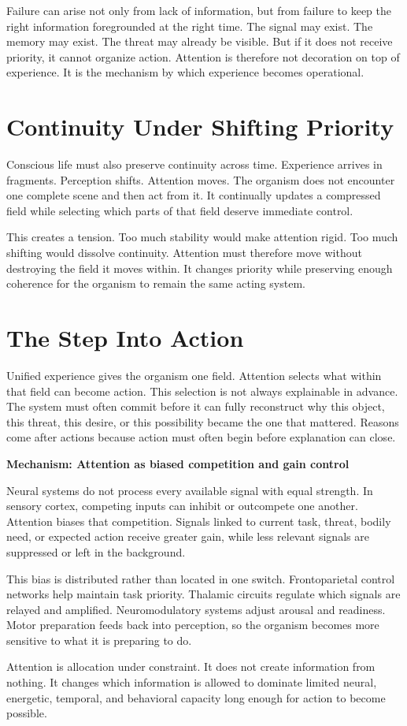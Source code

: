\documentclass[11pt,twoside,openright]{book}
\newenvironment{mechanismbox}[1]
  {\begin{framed}\noindent\textbf{Mechanism: #1}\par\medskip}
  {\end{framed}}
\begin{document}
Failure can arise not only from lack of information, but from failure to keep the right information foregrounded at the right time. The signal may exist. The memory may exist. The threat may already be visible. But if it does not receive priority, it cannot organize action. Attention is therefore not decoration on top of experience. It is the mechanism by which experience becomes operational.

\section*{Continuity Under Shifting Priority}

Conscious life must also preserve continuity across time. Experience arrives in fragments. Perception shifts. Attention moves. The organism does not encounter one complete scene and then act from it. It continually updates a compressed field while selecting which parts of that field deserve immediate control.

This creates a tension. Too much stability would make attention rigid. Too much shifting would dissolve continuity. Attention must therefore move without destroying the field it moves within. It changes priority while preserving enough coherence for the organism to remain the same acting system.

\section*{The Step Into Action}

Unified experience gives the organism one field. Attention selects what within that field can become action. This selection is not always explainable in advance. The system must often commit before it can fully reconstruct why this object, this threat, this desire, or this possibility became the one that mattered. Reasons come after actions because action must often begin before explanation can close.

\begin{mechanismbox}{Attention as biased competition and gain control}
Neural systems do not process every available signal with equal strength. In sensory cortex, competing inputs can inhibit or outcompete one another. Attention biases that competition. Signals linked to current task, threat, bodily need, or expected action receive greater gain, while less relevant signals are suppressed or left in the background.

This bias is distributed rather than located in one switch. Frontoparietal control networks help maintain task priority. Thalamic circuits regulate which signals are relayed and amplified. Neuromodulatory systems adjust arousal and readiness. Motor preparation feeds back into perception, so the organism becomes more sensitive to what it is preparing to do.

Attention is allocation under constraint. It does not create information from nothing. It changes which information is allowed to dominate limited neural, energetic, temporal, and behavioral capacity long enough for action to become possible.
\end{mechanismbox}
\end{document}
